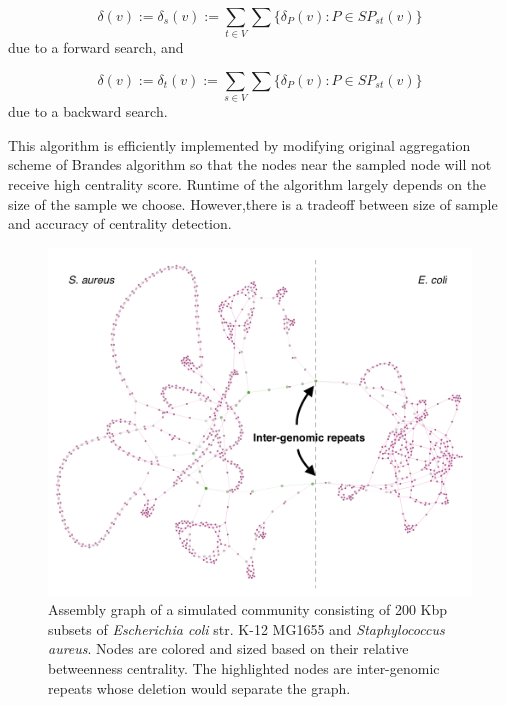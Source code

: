 \documentclass[runningheads,a4paper]{llncs}
\begin{document}
$$\delta(v) := \delta_{s}(v) := \sum_{t \in V}\sum \{\delta_{P}(v):  P \in SP_{st}(v)\}$$
due to a forward search, and 

$$\delta(v) := \delta_{t}(v) := \sum_{s \in V}\sum \{\delta_{P}(v):  P \in SP_{st}(v)\}$$
due to a backward search. 

This algorithm is efficiently implemented by modifying original aggregation scheme of Brandes algorithm so that the nodes near the sampled node will not receive high centrality score. Runtime of the algorithm largely depends on the size of the sample we choose. However,there is a tradeoff between size of sample and accuracy of centrality detection.  



\begin{figure}[htbp]
\centering
\includegraphics[width=\textwidth]{es_mix_200kb_k21.png}
\caption{Assembly graph of a simulated community consisting of 200 Kbp subsets of \textit{Escherichia coli} str. K-12 MG1655 and \textit{Staphylococcus aureus}.  Nodes are colored and sized based on their relative betweenness centrality. The highlighted nodes are inter-genomic repeats whose deletion would separate the graph.}
\label{fig:sampled_nodes}
\end{figure}
\end{document}
